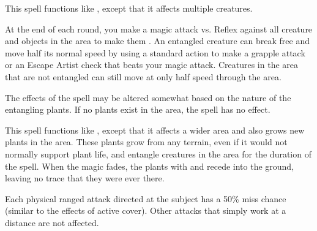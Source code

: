 \spellrng{\rngmed}
\begin{spelleffect}
  This spell functions like , except that it affects multiple creatures.
\end{spelleffect}

\spellrng{\rngmed}
\begin{spelleffect}
    At the end of each round, you make a magic attack vs. Reflex against all creature and objects in the area to make them \entangled. An entangled creature can break free and move half its normal speed by using a standard action to make a grapple attack or an Escape Artist check that beats your magic attack. Creatures in the area that are not entangled can still move at only half speed through the area.
\end{spelleffect}
\begin{spellnotes}
    The effects of the spell may be altered somewhat based on the nature of the entangling plants. If no plants exist in the area, the spell has no effect.
\end{spellnotes}

\begin{spelleffect}
  This spell functions like , except that it affects a wider area and also grows new plants in the area. These plants grow from any terrain, even if it would not normally support plant life, and entangle creatures in the area for the duration of the spell. When the magic fades, the plants with and recede into the ground, leaving no trace that they were ever there.
\end{spelleffect}

\begin{spelleffect}
  Each physical ranged attack directed at the subject has a 50\% miss chance (similar to the effects of active cover). Other attacks that simply work at a distance are not affected.
\end{spelleffect}

